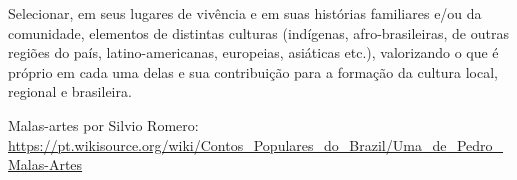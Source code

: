 
Selecionar, em seus lugares de vivência e em suas histórias familiares e/ou da comunidade, elementos de distintas culturas (indígenas, afro-brasileiras, de outras regiões do país, latino-americanas, europeias, asiáticas etc.), valorizando o que é próprio em cada uma delas e sua contribuição para a formação da cultura local, regional e brasileira.

Malas-artes por Silvio Romero: \url{https://pt.wikisource.org/wiki/Contos_Populares_do_Brazil/Uma_de_Pedro_Malas-Artes}